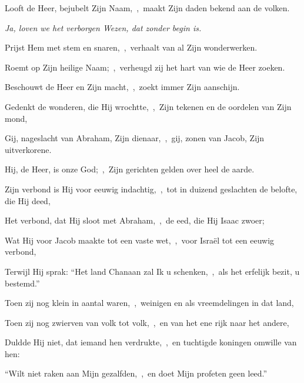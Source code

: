 \documentclass[12pt,twoside,a5paper]{article}
\begin{document}
\begin{halfparskip}
  Looft de Heer, bejubelt Zijn Naam,~\sep\ maakt Zijn daden bekend aan de volken.


   \emph{Ja, loven we het verborgen Wezen, dat zonder begin is.}

  Prijst Hem met stem en snaren,~\sep\ verhaalt van al Zijn wonderwerken.

  Roemt op Zijn heilige Naam;~\sep\ verheugd zij het hart van wie de Heer zoeken.

  Beschouwt de Heer en Zijn macht,~\sep\ zoekt immer Zijn aanschijn.

  Gedenkt de wonderen, die Hij wrochtte,~\sep\ Zijn tekenen en de oordelen van Zijn mond,

  Gij, nageslacht van Abraham, Zijn dienaar,~\sep\ gij, zonen van Jacob, Zijn uitverkorene.

  Hij, de Heer, is onze God;~\sep\ Zijn gerichten gelden over heel de aarde.
\end{halfparskip}


\begin{halfparskip}
  Zijn verbond is Hij voor eeuwig indachtig,~\sep\ tot in duizend geslachten de belofte, die Hij deed,

  Het verbond, dat Hij sloot met Abraham,~\sep\ de eed, die Hij Isaac zwoer;

  Wat Hij voor Jacob maakte tot een vaste wet,~\sep\ voor Israël tot een eeuwig verbond,

  Terwijl Hij sprak: ``Het land Chanaan zal Ik u schenken,~\sep\ als het erfelijk bezit, u bestemd.''

  Toen zij nog klein in aantal waren,~\sep\ weinigen en als vreemdelingen in dat land,

  Toen zij nog zwierven van volk tot volk,~\sep\ en van het ene rijk naar het andere,

  Duldde Hij niet, dat iemand hen verdrukte,~\sep\ en tuchtigde koningen omwille van hen:

  ``Wilt niet raken aan Mijn gezalfden,~\sep\ en doet Mijn profeten geen leed.''
\end{halfparskip}

\end{document}
